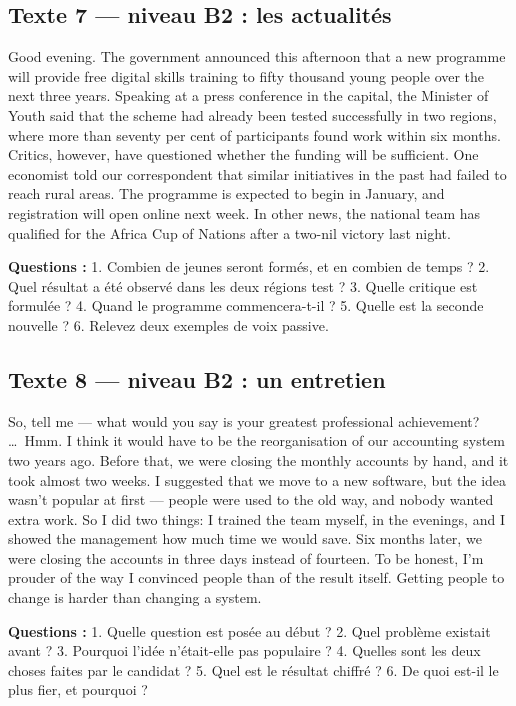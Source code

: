 \subsection{Texte 7 --- niveau B2 : les actualités}
\begin{dialoguebox}
\begin{anglais}
Good evening. The government announced this afternoon that a new programme will provide
free digital skills training to fifty thousand young people over the next three years.
Speaking at a press conference in the capital, the Minister of Youth said that the scheme
had already been tested successfully in two regions, where more than seventy per cent of
participants found work within six months. Critics, however, have questioned whether the
funding will be sufficient. One economist told our correspondent that similar initiatives
in the past had failed to reach rural areas. The programme is expected to begin in January,
and registration will open online next week. In other news, the national team has qualified
for the Africa Cup of Nations after a two-nil victory last night.
\end{anglais}
\end{dialoguebox}
\textbf{Questions :} 1. Combien de jeunes seront formés, et en combien de temps ?
2. Quel résultat a été observé dans les deux régions test ? 3. Quelle critique est formulée ?
4. Quand le programme commencera-t-il ? 5. Quelle est la seconde nouvelle ?
6. Relevez deux exemples de voix passive.

\subsection{Texte 8 --- niveau B2 : un entretien}
\begin{dialoguebox}
\begin{anglais}
So, tell me --- what would you say is your greatest professional achievement? \ldots\ Hmm.
I think it would have to be the reorganisation of our accounting system two years ago.
Before that, we were closing the monthly accounts by hand, and it took almost two weeks.
I suggested that we move to a new software, but the idea wasn't popular at first --- people
were used to the old way, and nobody wanted extra work. So I did two things: I trained the
team myself, in the evenings, and I showed the management how much time we would save.
Six months later, we were closing the accounts in three days instead of fourteen. To be
honest, I'm prouder of the way I convinced people than of the result itself. Getting people
to change is harder than changing a system.
\end{anglais}
\end{dialoguebox}
\textbf{Questions :} 1. Quelle question est posée au début ? 2. Quel problème existait avant ?
3. Pourquoi l'idée n'était-elle pas populaire ? 4. Quelles sont les deux choses faites par
le candidat ? 5. Quel est le résultat chiffré ? 6. De quoi est-il le plus fier, et pourquoi ?

